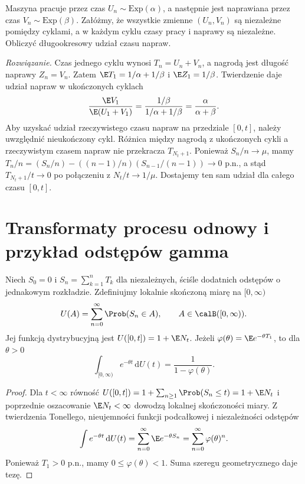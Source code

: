 \begin{zadanie}
Maszyna pracuje przez czas $U_n\sim\mathrm{Exp}(\alpha)$,
a następnie jest naprawiana przez czas
$V_n\sim\mathrm{Exp}(\beta)$. Załóżmy, że wszystkie
zmienne $(U_n,V_n)$ są niezależne pomiędzy cyklami,
a w każdym cyklu czasy pracy i naprawy są niezależne.
Obliczyć długookresowy udział czasu napraw.

\emph{Rozwiązanie.} Czas jednego cyklu wynosi
$T_n=U_n+V_n$, a nagrodą jest długość naprawy $Z_n=V_n$.
Zatem $\E T_1=1/\alpha+1/\beta$ i $\E Z_1=1/\beta$.
Twierdzenie daje udział napraw w ukończonych cyklach
\[
\frac{\E V_1}{\E(U_1+V_1)}
=\frac{1/\beta}{1/\alpha+1/\beta}
=\frac{\alpha}{\alpha+\beta}.
\]
Aby uzyskać udział rzeczywistego czasu napraw na przedziale
$[0,t]$, należy uwzględnić nieukończony cykl. Różnica
między nagrodą z ukończonych cykli a rzeczywistym czasem
napraw nie przekracza $T_{N_t+1}$. Ponieważ
$S_n/n\to\mu$, mamy
$T_n/n=(S_n/n)-((n-1)/n)(S_{n-1}/(n-1))\to0$ p.n.,
a stąd $T_{N_t+1}/t\to0$ po połączeniu z $N_t/t\to1/\mu$.
Dostajemy ten sam udział dla całego czasu $[0,t]$.
\end{zadanie}


\section{Transformaty procesu odnowy i przykład odstępów gamma}
\begin{twierdzenie}
Niech $S_0=0$ i $S_n=\sum_{k=1}^nT_k$ dla niezależnych,
ściśle dodatnich odstępów o jednakowym rozkładzie.
Zdefiniujmy lokalnie skończoną miarę na $[0,\infty)$
\[
U(A)=\sum_{n=0}^\infty\Prob(S_n\in A),\qquad
A\in\calB([0,\infty)).
\]
Jej funkcją dystrybucyjną jest $U([0,t])=1+\E N_t$.
Jeżeli $\varphi(\theta)=\E e^{-\theta T_1}$, to dla $\theta>0$
\[
\int_{[0,\infty)}e^{-\theta t}\,\mathrm dU(t)
=\frac{1}{1-\varphi(\theta)}.
\]
\end{twierdzenie}
\begin{proof}
Dla $t<\infty$ równość
$U([0,t])=1+\sum_{n\ge1}\Prob(S_n\le t)=1+\E N_t$
i poprzednie oszacowanie $\E N_t<\infty$ dowodzą
lokalnej skończoności miary. Z twierdzenia Tonellego,
nieujemności funkcji podcałkowej i niezależności odstępów
\[
\int e^{-\theta t}\,\mathrm dU(t)
=\sum_{n=0}^\infty\E e^{-\theta S_n}
=\sum_{n=0}^\infty \varphi(\theta)^n.
\]
Ponieważ $T_1>0$ p.n., mamy $0\le\varphi(\theta)<1$.
Suma szeregu geometrycznego daje tezę.
\end{proof}


